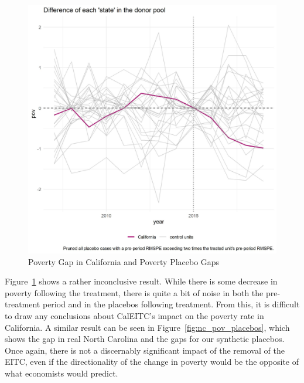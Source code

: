 \documentclass{article}
\begin{document}
 \begin{figure}[H]
    \caption{Poverty Gap in California and Poverty Placebo Gaps}
    \begin{center}
        \includegraphics[width=.85\textwidth]{ca_pov_placebos}
    \end{center}
    \label{fig:ca_pov_placebos}{}
\end{figure}

Figure~\ref{fig:ca_pov_placebos} shows a rather inconclusive result. While there is some decrease in poverty following the treatment, there is quite a bit of noise in both the pre-treatment period and in the placebos following treatment. From this, it is difficult to draw any conclusions about CalEITC's impact on the poverty rate in California. A similar result can be seen in Figure~\ref{fig:nc_pov_placebos}, which shows the gap in real North Carolina and the gaps for our synthetic placebos. Once again, there is not a discernably significant impact of the removal of the EITC, even if the directionality of the change in poverty would be the opposite of what economists would predict. 
\end{document}
